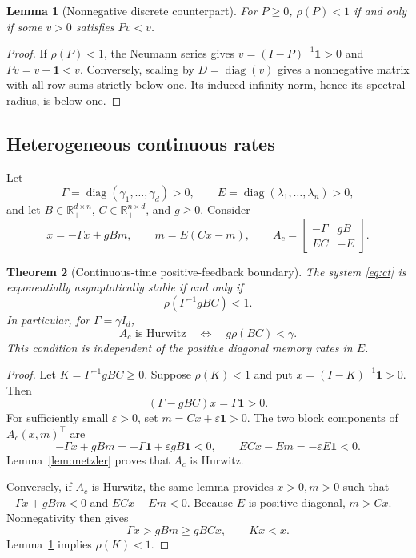 \documentclass[11pt,a4paper]{article}
\newtheorem{theorem}{Theorem}[section]
\newtheorem{lemma}[theorem]{Lemma}
\theoremstyle{definition}\newtheorem{definition}[theorem]{Definition}
\theoremstyle{remark}\newtheorem{remark}[theorem]{Remark}
\newcommand{\R}{\mathbb R}\newcommand{\E}{\mathbb E}\newcommand{\Prob}{\mathbb P}
\newcommand{\one}{\mathbf 1}\newcommand{\diag}{\operatorname{diag}}
\begin{document}
\begin{lemma}[Nonnegative discrete counterpart]\label{lem:schur}
For $P\ge0$, $\rho(P)<1$ if and only if some $v>0$ satisfies $Pv<v$.
\end{lemma}
\begin{proof}
If $\rho(P)<1$, the Neumann series gives $v=(I-P)^{-1}\one>0$ and $Pv=v-\one<v$. Conversely, scaling by $D=\diag(v)$ gives a nonnegative matrix with all row sums strictly below one. Its induced infinity norm, hence its spectral radius, is below one.
\end{proof}

\subsection{Heterogeneous continuous rates}
Let
\[
 \Gamma=\diag(\gamma_1,\ldots,\gamma_d)>0,
 \qquad E=\diag(\lambda_1,\ldots,\lambda_n)>0,
\]
and let $B\in\R_+^{d\times n}$, $C\in\R_+^{n\times d}$, and $g\ge0$. Consider
\begin{equation}
 \dot x=-\Gamma x+gBm,\qquad \dot m=E(Cx-m),\qquad
 A_c=\begin{bmatrix}-\Gamma&gB\\EC&-E\end{bmatrix}.
 \label{eq:ct}
\end{equation}

\begin{theorem}[Continuous-time positive-feedback boundary]\label{thm:ct}
The system \eqref{eq:ct} is exponentially asymptotically stable if and only if
\begin{equation}
 \rho\!\left(\Gamma^{-1}gBC\right)<1.\label{eq:ct-threshold}
\end{equation}
In particular, for $\Gamma=\gamma I_d$,
\[
 A_c\text{ is Hurwitz}\quad\Longleftrightarrow\quad g\rho(BC)<\gamma.
\]
This condition is independent of the positive diagonal memory rates in $E$.
\end{theorem}
\begin{proof}
Let $K=\Gamma^{-1}gBC\ge0$. Suppose $\rho(K)<1$ and put $x=(I-K)^{-1}\one>0$. Then
\[
 (\Gamma-gBC)x=\Gamma\one>0.
\]
For sufficiently small $\varepsilon>0$, set $m=Cx+\varepsilon\one>0$. The two block components of $A_c(x,m)^\top$ are
\[
 -\Gamma x+gBm=-\Gamma\one+\varepsilon gB\one<0,
 \qquad ECx-Em=-\varepsilon E\one<0.
\]
Lemma~\ref{lem:metzler} proves that $A_c$ is Hurwitz.

Conversely, if $A_c$ is Hurwitz, the same lemma provides $x>0,m>0$ such that
$-\Gamma x+gBm<0$ and $ECx-Em<0$. Because $E$ is positive diagonal, $m>Cx$. Nonnegativity then gives
\[
 \Gamma x>gBm\ge gBCx,
 \qquad Kx<x.
\]
Lemma~\ref{lem:schur} implies $\rho(K)<1$.
\end{proof}
\end{document}
